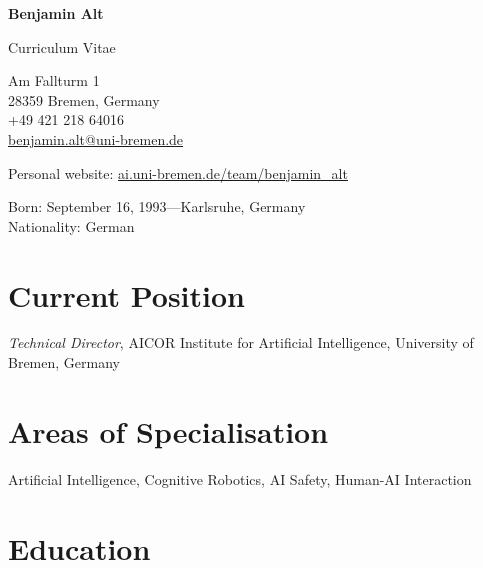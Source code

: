 \documentclass[11pt]{article} %
\begin{document}

{\LARGE\bfseries Benjamin Alt}

\bigskip

Curriculum Vitae

\bigskip\medskip %

\begin{minipage}{.5\textwidth}
Am Fallturm 1\\
28359 Bremen, Germany\\
+49 421 218 64016\\
\href{mailto:benjamin.alt@uni-bremen.de}{benjamin.alt@uni-bremen.de}
\end{minipage}%

\medskip %

Personal website: \href{https://ai.uni-bremen.de/team/benjamin_alt}{ai.uni-bremen.de/team/benjamin\_alt}

\medskip %

Born: September 16, 1993---Karlsruhe, Germany\\
Nationality: German


\section*{Current Position}

\emph{Technical Director}, AICOR Institute for Artificial Intelligence, University of Bremen, Germany


\section*{Areas of Specialisation}

Artificial Intelligence, Cognitive Robotics, AI Safety, Human-AI Interaction


\section*{Education}
\end{document}
